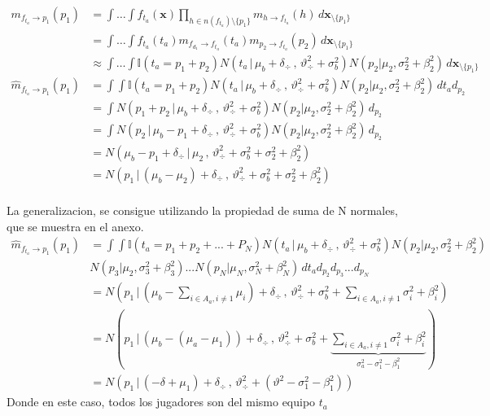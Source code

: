 \documentclass[11pt,twoside, spanish]{report} %
\begin{document}
\begin{equation}\label{eq:^m_fta_p}
	\begin{split}
		m_{f_{t_a} \rightarrow p_1}(p_1) &= \int \dots \int f_{t_a}(\textbf{x}) \prod_{h \in n(f_{t_a}) \setminus \{p_1\} } m_{h \rightarrow f_{t_a}}(h) \, d\textbf{x}_{\setminus \{p_1\} }  \\
		&= \int \dots \int f_{t_a}(t_a)  m_{f_{d_1} \rightarrow f_{t_a}}(t_a) m_{p_2 \rightarrow f_{t_a}}(p_2)\, d\textbf{x}_{\setminus \{p_1\} }  \\
		&\approx  \int \dots \int \mathbb{I}(t_a = p_1 + p_2) N(t_a \, | \, \mu_b + \delta_{\div} \, , \, \vartheta_{\div}^2 + \sigma_b^2) N(p_2 | \mu_2 , \sigma_2^2 + \beta_2^2)  \, d\textbf{x}_{\setminus \{p_1\} } \\[0.1cm]
		\widehat{m}_{f_{t_a} \rightarrow p_1}(p_1)  & =\int \int \mathbb{I}(t_a = p_1 + p_2) N(t_a \, | \, \mu_b + \delta_{\div} \, , \, \vartheta_{\div}^2 + \sigma_b^2) N(p_2 | \mu_2 , \sigma_2^2 + \beta_2^2)  \, d{t_a} d_{p_2} \\
		& =\int N(p_1 + p_2 \, | \, \mu_b + \delta_{\div} \, , \, \vartheta_{\div}^2 + \sigma_b^2) N(p_2 | \mu_2 , \sigma_2^2+ \beta_2^2 )   \, d_{p_2} \\
		& =\int N(p_2 \, | \, \mu_b - p_1 + \delta_{\div} \, , \, \vartheta_{\div}^2 + \sigma_b^2) N(p_2 | \mu_2 , \sigma_2^2 + \beta_2^2)   \, d_{p_2} \\
		& = N(\mu_b - p_1 + \delta_{\div} \,|\, \mu_2 \,,\,\vartheta_{\div}^2 + \sigma_b^2 + \sigma_2^2 + \beta_2^2)   \\
		&=  N( p_1 \,|\,  (\mu_b - \mu_2) + \delta_{\div}  \,,\,\vartheta_{\div}^2 + \sigma_b^2 + \sigma_2^2 + \beta_2^2)  \\
	\end{split}
\end{equation}


La generalizacion, se consigue utilizando la propiedad de suma de N normales, que se muestra en el anexo.
\begin{equation}
	\begin{split}
		\widehat{m}_{f_{t_a} \rightarrow p_1}(p_1) &=\int \int \mathbb{I}(t_a = p_1 + p_2 + ...+ P_N) N(t_a \, | \, \mu_b + \delta_{\div} \, , \, \vartheta_{\div}^2 + \sigma_b^2) N(p_2 | \mu_2 , \sigma_2^2 + \beta_2^2)\\ &N(p_3 | \mu_2 , \sigma_3^2 + \beta_3^2)... N(p_N | \mu_N , \sigma_N^2 + \beta_N^2)  \, d{t_a} d_{p_2}d_{p_3}...d_{p_N} \\
		&= N( p_1 \,|\, (\mu_b  - \sum_{i \in A_a, i\neq1} \mu_i) + \delta_{\div}  \,,\,\vartheta_{\div}^2 + \sigma_b^2 + \sum_{i \in A_a, i\neq1} \sigma_i^2 + \beta_i^2 ) \\
		&= N( p_1 \,|\, (\mu_b  -(\mu_a-\mu_1)) + \delta_{\div}  \,,\,\vartheta_{\div}^2 + \sigma_b^2 + \underbrace{\sum_{i \in A_a, i\neq1} \sigma_i^2 + \beta_i^2}_{\sigma_a^2-\sigma_1^2 - \beta_1^2} ) \\
		& = N( p_1 \,|\, (-\delta + \mu_1) + \delta_{\div}  \,,\,\vartheta_{\div}^2 + (\vartheta^2 - \sigma_1^2 - \beta_1^2))
	\end{split}
\end{equation}
Donde en este caso, todos los jugadores son del mismo equipo $t_a$
\end{document}
